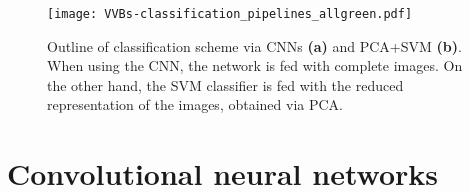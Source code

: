 



\begin{figure}[tb]
	\centering
	\texttt{[image: VVBs-classification\_pipelines\_allgreen.pdf]}
	\caption{
	Outline of classification scheme via CNNs \textbf{(a)} and PCA+SVM \textbf{(b)}.
	When using the CNN, the network is fed with complete images.
	On the other hand, the SVM classifier is fed with the reduced representation of the images, obtained via PCA.
	}
	\label{fig:VVBs:class_techniques}
\end{figure}


\section{Convolutional neural networks}
\label{sec:VVBs:CNNs}

